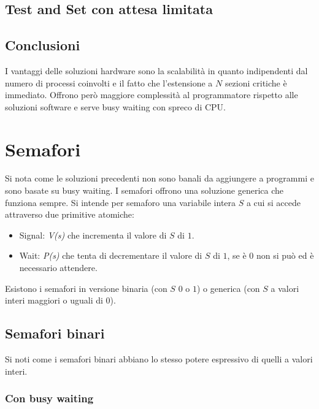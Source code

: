 \subsection{Test and Set con attesa limitata}

\subsection{Conclusioni}
I vantaggi delle soluzioni hardware sono la scalabilit\`a in quanto indipendenti dal numero di processi coinvolti e il fatto che l'estensione a $N$ sezioni critiche \`e immediato. 
Offrono per\`o maggiore complessit\`a al programmatore rispetto alle soluzioni software e serve busy waiting con spreco di CPU.
\section{Semafori}
Si nota come le soluzioni precedenti non sono banali da aggiungere a programmi e sono basate su busy waiting. I semafori offrono una soluzione generica che funziona sempre. Si intende
per semaforo una variabile intera $S$ a cui si accede attraverso due primitive atomiche: 
\begin{itemize}
	\item Signal: \emph{V(s)} che incrementa il valore di $S$ di $1$. 
	\item Wait: \emph{P(s)} che tenta di decrementare il valore di $S$ di $1$, se \`e $0$ non si pu\`o ed \`e necessario attendere.
\end{itemize}
Esistono i semafori in versione binaria (con $S$ $0$ o $1$) o generica (con $S$ a valori interi maggiori o uguali di $0$).
\subsection{Semafori binari} 
Si noti come i semafori binari abbiano lo stesso potere espressivo di quelli a valori interi.

\subsubsection{Con busy waiting}
\begin{multicols}{2}
	
	\columnbreak
	
\end{multicols}
